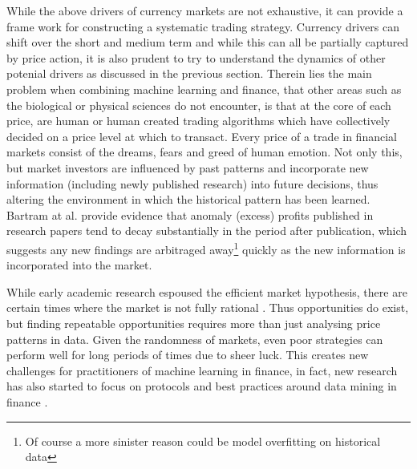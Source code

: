 \documentclass[11pt]{article}
\begin{document}
While the above drivers of currency markets are not exhaustive, it can provide a frame work for constructing a systematic trading strategy. Currency drivers can shift over the short and medium term and while this can all be partially captured by price action, it is also prudent to try to understand the dynamics of other potenial drivers as discussed in the previous section. \newline
Therein lies the main problem when combining machine learning and finance, that other areas such as the biological or physical sciences do not encounter, is that at the core of each price, are human or human created trading algorithms which have collectively decided on a price level at which to transact. \newline Every price of a trade in financial markets consist of the dreams, fears and greed of human emotion. Not only this, but market investors are influenced by past patterns and incorporate new information (including newly published research) into future decisions, thus altering the environment in which the historical pattern has been learned. Bartram at al. provide evidence that anomaly (excess) profits published in research papers tend to decay substantially in the period after publication, which suggests any new findings are arbitraged away\footnote{Of course a more sinister reason could be model overfitting on historical data} quickly as the new information is incorporated into the market\cite{Bartram2019}. 

While early academic research espoused the efficient market hypothesis, there are certain times where the market is not fully rational \cite{Dome2008}. Thus opportunities do exist, but finding repeatable opportunities requires more than just analysing price patterns in data. Given the randomness of markets, even poor strategies can perform well for long periods of times due to sheer luck. This creates new challenges for practitioners of machine learning in finance, in fact, new research has also started to focus on protocols and best practices around data mining in finance \cite{Arnott2018}.
\end{document}
